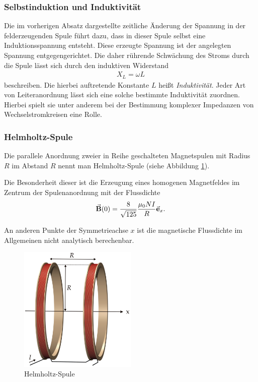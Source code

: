 \subsubsection{Selbstinduktion und Induktivität}
Die im vorherigen Absatz dargestellte zeitliche Änderung der Spannung in der felderzeugenden Spule führt dazu, dass in dieser Spule selbst eine Induktionsspannung entsteht. Diese erzeugte Spannung ist der angelegten Spannung entgegengerichtet. Die daher rührende Schwächung des Stroms durch die Spule lässt sich durch den induktiven Widerstand
\begin{align}
  X_L = \omega L \label{eq:indukt_widerst}
\end{align}
beschreiben. Die hierbei auftretende Konstante $L$ heißt \textit{Induktivität}. Jeder Art von Leiteranordnung lässt sich eine solche bestimmte Induktivität zuordnen. Hierbei spielt sie unter anderem bei der Bestimmung komplexer Impedanzen von Wechselstromkreisen eine Rolle.

\subsubsection{Helmholtz-Spule}
Die parallele Anordnung zweier in Reihe geschalteten Magnetspulen mit Radius $R$ im Abstand $R$ nennt man Helmholtz-Spule (siehe Abbildung \ref{fig:helmholtz_coil}).

Die Besonderheit dieser ist die Erzeugung eines homogenen Magnetfeldes im Zentrum der Spulenanordnung mit der Flussdichte
\begin{align}
  \va{B}(0) = \frac{8}{\sqrt{125}} \frac{\mu_0 N I}{R} \va{e}_x. \label{eq:b_hh}
\end{align}

An anderen Punkte der Symmetrieachse $x$ ist die magnetische Flussdichte im Allgemeinen nicht analytisch berechenbar.

\begin{figure}[H]
  \centering
  \includegraphics[width=0.5\textwidth]{files/Helmholtz_coils.png}
  \caption{Helmholtz-Spule}
  \label{fig:helmholtz_coil}
\end{figure}

